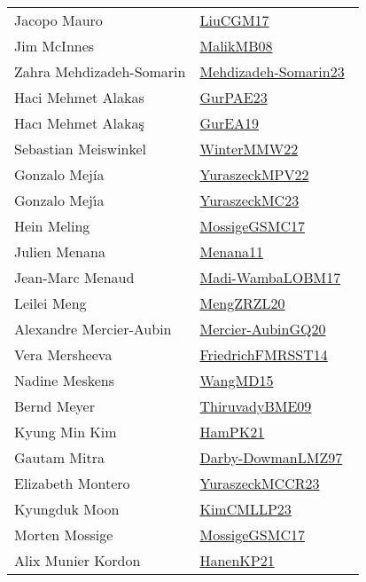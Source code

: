 {\begin{longtable}{p{4cm}p{20cm}}
Jacopo Mauro & \href{works/LiuCGM17.pdf}{LiuCGM17}~\cite{LiuCGM17}\\
Jim McInnes & \href{works/MalikMB08.pdf}{MalikMB08}~\cite{MalikMB08}\\
Zahra Mehdizadeh{-}Somarin & \href{works/Mehdizadeh-Somarin23.pdf}{Mehdizadeh-Somarin23}~\cite{Mehdizadeh-Somarin23}\\
Haci Mehmet Alakas & \href{works/GurPAE23.pdf}{GurPAE23}~\cite{GurPAE23}\\
Hacı Mehmet Alakaş & \href{works/GurEA19.pdf}{GurEA19}~\cite{GurEA19}\\
Sebastian Meiswinkel & \href{works/WinterMMW22.pdf}{WinterMMW22}~\cite{WinterMMW22}\\
Gonzalo Mej{\'i}a & \href{works/YuraszeckMPV22.pdf}{YuraszeckMPV22}~\cite{YuraszeckMPV22}\\
Gonzalo Mej{\'{\i}}a & \href{works/YuraszeckMC23.pdf}{YuraszeckMC23}~\cite{YuraszeckMC23}\\
Hein Meling & \href{works/MossigeGSMC17.pdf}{MossigeGSMC17}~\cite{MossigeGSMC17}\\
Julien Menana & \href{}{Menana11}~\cite{Menana11}\\
Jean{-}Marc Menaud & \href{works/Madi-WambaLOBM17.pdf}{Madi-WambaLOBM17}~\cite{Madi-WambaLOBM17}\\
Leilei Meng & \href{works/MengZRZL20.pdf}{MengZRZL20}~\cite{MengZRZL20}\\
Alexandre Mercier{-}Aubin & \href{works/Mercier-AubinGQ20.pdf}{Mercier-AubinGQ20}~\cite{Mercier-AubinGQ20}\\
Vera Mersheeva & \href{}{FriedrichFMRSST14}~\cite{FriedrichFMRSST14}\\
Nadine Meskens & \href{works/WangMD15.pdf}{WangMD15}~\cite{WangMD15}\\
Bernd Meyer & \href{works/ThiruvadyBME09.pdf}{ThiruvadyBME09}~\cite{ThiruvadyBME09}\\
Kyung Min Kim & \href{works/HamPK21.pdf}{HamPK21}~\cite{HamPK21}\\
Gautam Mitra & \href{works/Darby-DowmanLMZ97.pdf}{Darby-DowmanLMZ97}~\cite{Darby-DowmanLMZ97}\\
Elizabeth Montero & \href{works/YuraszeckMCCR23.pdf}{YuraszeckMCCR23}~\cite{YuraszeckMCCR23}\\
Kyungduk Moon & \href{works/KimCMLLP23.pdf}{KimCMLLP23}~\cite{KimCMLLP23}\\
Morten Mossige & \href{works/MossigeGSMC17.pdf}{MossigeGSMC17}~\cite{MossigeGSMC17}\\
Alix Munier Kordon & \href{works/HanenKP21.pdf}{HanenKP21}~\cite{HanenKP21}\\

\end{longtable}}

